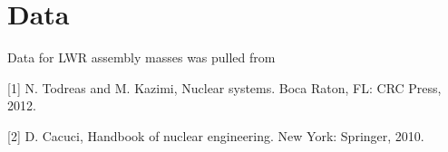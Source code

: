 \section{Data}
Data for LWR assembly masses was pulled from 

[1] N. Todreas and M. Kazimi, 
Nuclear systems. Boca Raton, FL: CRC Press, 2012.

[2] D. Cacuci, Handbook of nuclear engineering. New York: Springer, 2010.